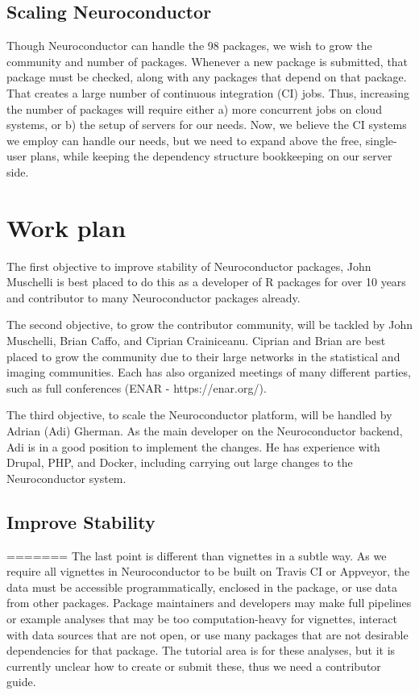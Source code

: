 \documentclass[]{elsarticle} %
\begin{document}
\hypertarget{scaling-neuroconductor}{%
\subsection{Scaling Neuroconductor}\label{scaling-neuroconductor}}

Though Neuroconductor can handle the 98 packages, we wish to grow the community and number of packages. Whenever a new package is submitted, that package must be checked, along with any packages that depend on that package. That creates a large number of continuous integration (CI) jobs. Thus, increasing the number of packages will require either a) more concurrent jobs on cloud systems, or b) the setup of servers for our needs. Now, we believe the CI systems we employ can handle our needs, but we need to expand above the free, single-user plans, while keeping the dependency structure bookkeeping on our server side.

\hypertarget{work-plan}{%
\section{Work plan}\label{work-plan}}

The first objective to improve stability of Neuroconductor packages, John Muschelli is best placed to do this as a developer of R packages for over 10 years and contributor to many Neuroconductor packages already.

The second objective, to grow the contributor community, will be tackled by
John Muschelli, Brian Caffo, and Ciprian Crainiceanu. Ciprian and Brian are best placed to grow the community due to their large networks in the statistical and imaging communities. Each has also organized meetings of many different parties, such as full conferences (ENAR - https://enar.org/).

The third objective, to scale the Neuroconductor platform, will be handled by Adrian (Adi) Gherman. As the main developer on the Neuroconductor backend, Adi is in a good position to implement the changes. He has experience with Drupal, PHP, and Docker, including carrying out large changes to the Neuroconductor system.

\hypertarget{improve-stability}{%
\subsection{Improve Stability}\label{improve-stability}}
=======
The last point is different than vignettes in a subtle way. As we
require all vignettes in Neuroconductor to be built on Travis CI or
Appveyor, the data must be accessible programmatically, enclosed in the
package, or use data from other packages. Package maintainers and
developers may make full pipelines or example analyses that may be too
computation-heavy for vignettes, interact with data sources that are not
open, or use many packages that are not desirable dependencies for that
package. The tutorial area is for these analyses, but it is currently
unclear how to create or submit these, thus we need a contributor guide.
\end{document}

